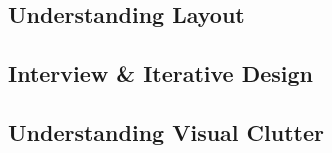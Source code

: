 
\subsection{Understanding Layout}

\subsection{Interview \& Iterative Design}

\subsection{Understanding Visual Clutter}